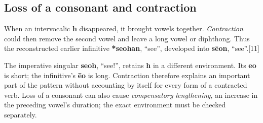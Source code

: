 \subsection*{Loss of a consonant and contraction}
When an intervocalic \textbf{h} disappeared, it brought vowels together. \emph{Contraction} could then remove the second vowel and leave a long vowel or diphthong. Thus the reconstructed earlier infinitive \textbf{*seohan}, “see”, developed into \textbf{sēon}, “see”.[11]\par
The imperative singular \textbf{seoh}, “see!”, retains \textbf{h} in a different environment. Its \textbf{eo} is short; the infinitive’s \textbf{ēo} is long. Contraction therefore explains an important part of the pattern without accounting by itself for every form of a contracted verb. Loss of a consonant can also cause \emph{compensatory lengthening}, an increase in the preceding vowel’s duration; the exact environment must be checked separately.\par
